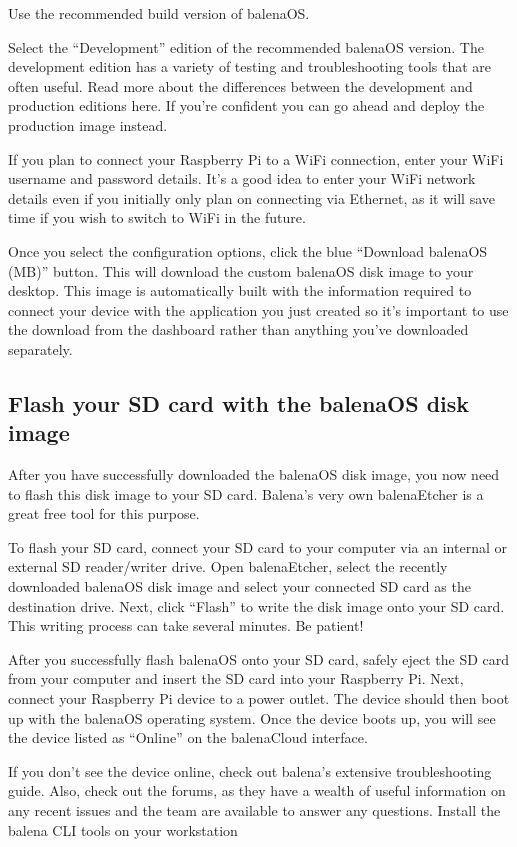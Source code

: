     Use the recommended build version of balenaOS.

    Select the “Development” edition of the recommended balenaOS version. The development edition has a variety of testing and troubleshooting tools that are often useful. Read more about the differences between the development and production editions here. If you're confident you can go ahead and deploy the production image instead.

    If you plan to connect your Raspberry Pi to a WiFi connection, enter your WiFi username and password details. It's a good idea to enter your WiFi network details even if you initially only plan on connecting via Ethernet, as it will save time if you wish to switch to WiFi in the future.
    
Once you select the configuration options, click the blue “Download balenaOS (MB)” button. This will download the custom balenaOS disk image to your desktop. This image is automatically built with the information required to connect your device with the application you just created so it's important to use the download from the dashboard rather than anything you've downloaded separately.

\subsection*{Flash your SD card with the balenaOS disk image}

After you have successfully downloaded the balenaOS disk image, you now need to flash this disk image to your SD card. Balena’s very own balenaEtcher is a great free tool for this purpose.

To flash your SD card, connect your SD card to your computer via an internal or external SD reader/writer drive. Open balenaEtcher, select the recently downloaded balenaOS disk image and select your connected SD card as the destination drive. Next, click “Flash” to write the disk image onto your SD card. This writing process can take several minutes. Be patient!

After you successfully flash balenaOS onto your SD card, safely eject the SD card from your computer and insert the SD card into your Raspberry Pi. Next, connect your Raspberry Pi device to a power outlet. The device should then boot up with the balenaOS operating system. Once the device boots up, you will see the device listed as “Online” on the balenaCloud interface.

If you don’t see the device online, check out balena's extensive troubleshooting guide. Also, check out the forums, as they have a wealth of useful information on any recent issues and the team are available to answer any questions.
Install the balena CLI tools on your workstation

